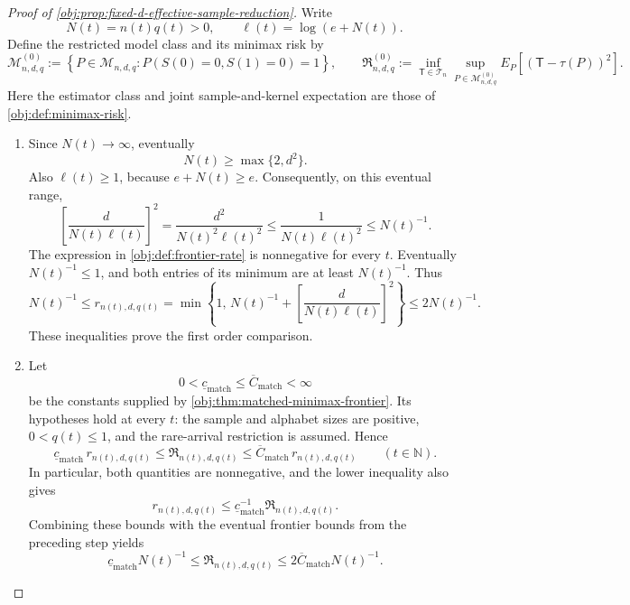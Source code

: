 \documentclass[11pt]{article}
\begin{document}
\begin{proof}[Proof of \cref{obj:prop:fixed-d-effective-sample-reduction}]
Write
\[
N(t)=n(t)q(t)>0,
\qquad
\ell(t)=\log(e+N(t)).
\]
Define the restricted model class and its minimax risk by
\[
\mathcal M^{(0)}_{n,d,q}
:=
\left\{
P\in\mathcal M_{n,d,q}:
P(S(0)=0,S(1)=0)=1
\right\},
\qquad
\mathfrak R^{(0)}_{n,d,q}
:=
\inf_{\mathsf T\in\mathcal T_n}
\sup_{P\in\mathcal M^{(0)}_{n,d,q}}
E_P[(\mathsf T-\tau(P))^2].
\]
Here the estimator class and joint sample-and-kernel expectation are those of
\cref{obj:def:minimax-risk}.

\begin{enumerate}
\item Since \(N(t)\to\infty\), eventually
\[
N(t)\ge \max\{2,d^2\}.
\]
Also \(\ell(t)\ge1\), because \(e+N(t)\ge e\). Consequently, on this eventual range,
\[
\left[\frac{d}{N(t)\ell(t)}\right]^2
=
\frac{d^2}{N(t)^2\ell(t)^2}
\le
\frac{1}{N(t)\ell(t)^2}
\le
N(t)^{-1}.
\]
The expression in \cref{obj:def:frontier-rate} is nonnegative for every \(t\).
Eventually \(N(t)^{-1}\le1\), and both entries of its minimum are at least
\(N(t)^{-1}\). Thus
\[
N(t)^{-1}
\le
r_{n(t),d,q(t)}
=
\min\left\{
1,\,
N(t)^{-1}+
\left[\frac{d}{N(t)\ell(t)}\right]^2
\right\}
\le
2N(t)^{-1}.
\]
These inequalities prove the first order comparison.

\item Let
\[
0<\underline c_{\mathrm{match}}
\le \overline C_{\mathrm{match}}<\infty
\]
be the constants supplied by \cref{obj:thm:matched-minimax-frontier}.
Its hypotheses hold at every \(t\): the sample and alphabet sizes are positive,
\(0<q(t)\le1\), and the rare-arrival restriction is assumed. Hence
\[
\underline c_{\mathrm{match}}\,r_{n(t),d,q(t)}
\le
\mathfrak R_{n(t),d,q(t)}
\le
\overline C_{\mathrm{match}}\,r_{n(t),d,q(t)}
\qquad(t\in\mathbb N).
\]
In particular, both quantities are nonnegative, and the lower inequality also gives
\[
r_{n(t),d,q(t)}
\le
\underline c_{\mathrm{match}}^{-1}
\mathfrak R_{n(t),d,q(t)}.
\]
Combining these bounds with the eventual frontier bounds from the preceding step yields
\[
\underline c_{\mathrm{match}}N(t)^{-1}
\le
\mathfrak R_{n(t),d,q(t)}
\le
2\overline C_{\mathrm{match}}N(t)^{-1}.
\]


\end{enumerate}
\end{proof}
\end{document}
